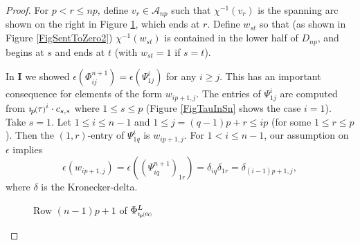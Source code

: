 \documentclass[11pt]{amsart}
\def\A{{\mathcal A}}
\newcommand*{\smallp}[1]{\scalebox{.75}{\ensuremath#1}}
\newcommand*{\subsmallp}[1]{\scalebox{.5}{\ensuremath#1}}
\newcommand{\pp}[2][p]{\imath_{\hspace*{-1pt}#1}\hspace*{-.5pt}\smallp(#2\smallp)}
\newcommand{\subpp}[2][p]{\imath_{\hspace*{-1pt}#1}\hspace*{-.5pt}\subsmallp(#2\subsmallp)}
\theoremstyle{definition}
\begin{document}
\begin{proof}
For $p< r \le np$, define $v_r\in\A_{np}$ such that $\chi^{-1}(v_r)$ is the spanning arc shown on the right in Figure \ref{FigPhiLCalcPhi}, which ends at $r$. Define $w_{st}$ so that (as shown in Figure \ref{FigSentToZero2}) $\chi^{-1}(w_{st})$ is contained in the lower half of $D_{np}$, and begins at $s$ and ends at $t$ (with $w_{st}=1$ if $s=t$).

In {\bf I} we showed $\epsilon(\Phi_{ij}^{n+1}) = \epsilon(\Psi_{1j}^i)$ for any $i\ge j$. This has an important consequence for elements of the form $w_{ip+1,j}$. The entries of $\Psi_{1j}^i$ are computed from $\pp\tau^i\cdot c_{s,\ast}$ where $1\le s\le p$ (Figure \ref{FigTauInSn} shows the case $i=1$). Take $s=1$. Let $1\le i\le n-1$ and $1\le j=(q-1)p+r\le ip$ (for some $1\le r\le p$). Then the $(1,r)$-entry of $\Psi_{1q}^i$ is $w_{ip+1,j}$. For $1<i\le n-1$, our assumption on $\epsilon$ implies
    \begin{equation}
    \epsilon(w_{ip+1,j})=\epsilon((\Psi_{iq}^{n+1})_{1r}) = \delta_{iq}\delta_{1r} = \delta_{(i-1)p+1,j},
    \label{EqnMod1Ws}
    \end{equation}
where $\delta$ is the Kronecker-delta. 

    \begin{figure}[ht]
      \caption{Row $(n-1)p+1$ of $\Phi_{\subpp\alpha}^L$}
      \label{FigPhiLCalcPhi}
    \end{figure}


\end{proof}
\end{document}
